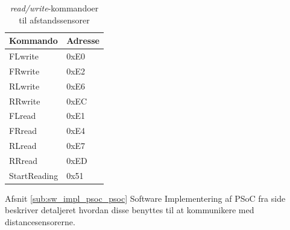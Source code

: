 \begin{table}[ht]\centering
	\begin{tabular}{| l | l |} \hline
		\textbf{Kommando} & \textbf{Adresse} \\\hline
		FLwrite 	 & 0xE0 \\\hline
		FRwrite 	 & 0xE2 \\\hline
		RLwrite 	 & 0xE6 \\\hline
		RRwrite 	 & 0xEC \\\hline
		FLread  	 & 0xE1 \\\hline
		FRread  	 & 0xE4 \\\hline
		RLread  	 & 0xE7 \\\hline
		RRread  	 & 0xED \\\hline
		StartReading & 0x51	\\\hline
	\end{tabular}
	\caption{\textit{read/write}-kommandoer til afstandssensorer}
	\label{table:adr_ds_cmd}
\end{table}

Afsnit \ref{sub:sw_impl_psoc_psoc} Software Implementering af PSoC fra side \pageref{sub:sw_impl_psoc_psoc} beskriver detaljeret hvordan disse benyttes til at kommunikere med distancesensorerne.

 